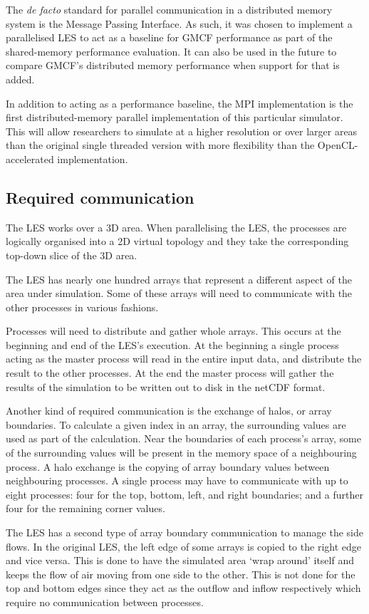 The \textit{de facto} standard for parallel communication in a distributed
memory system is the Message Passing Interface. As such, it was chosen to
implement a parallelised LES to act as a baseline for GMCF performance as part
of the shared-memory performance evaluation. It can also be used in the future
to compare GMCF's distributed memory performance when support for that is added.

In addition to acting as a performance baseline, the MPI implementation is the
first distributed-memory parallel implementation of this particular simulator.
This will allow researchers to simulate at a higher resolution or over larger
areas than the original single threaded version with more flexibility than the
OpenCL-accelerated implementation.

\subsection{Required communication}

The LES works over a 3D area. When parallelising the LES, the processes are
logically organised into a 2D virtual topology and they take the corresponding
top-down slice of the 3D area.

The LES has nearly one hundred arrays that represent a different aspect of the
area under simulation. Some of these arrays will need to communicate with the
other processes in various fashions.

Processes will need to distribute and gather whole arrays. This occurs at the
beginning and end of the LES's execution. At the beginning a single process
acting as the master process will read in the entire input data, and distribute
the result to the other processes. At the end the master process will gather the
results of the simulation to be written out to disk in the netCDF format.

Another kind of required communication is the exchange of halos, or array
boundaries. To calculate a given index in an array, the surrounding values are
used as part of the calculation. Near the boundaries of each process's array,
some of the surrounding values will be present in the memory space of a
neighbouring process. A halo exchange is the copying of array boundary values
between neighbouring processes. A single process may have to communicate with up
to eight processes: four for the top, bottom, left, and right boundaries; and a
further four for the remaining corner values.

The LES has a second type of array boundary communication to manage the side
flows. In the original LES, the left edge of some arrays is copied to the right
edge and vice versa. This is done to have the simulated area `wrap around'
itself and keeps the flow of air moving from one side to the other. This is not
done for the top and bottom edges since they act as the outflow and inflow
respectively which require no communication between processes.

